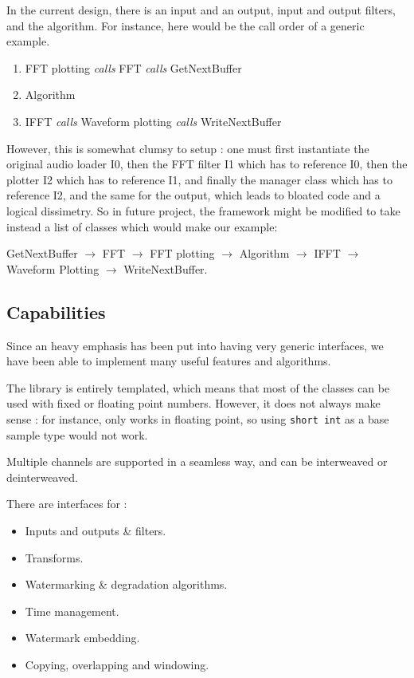 In the current design, there is an input and an output, input and output filters, and the algorithm. For instance, here would be the call order of a generic example.

\begin{enumerate}
\item FFT plotting \textit{calls} FFT \textit{calls} GetNextBuffer
\item Algorithm
\item IFFT \textit{calls} Waveform plotting \textit{calls} WriteNextBuffer
\end{enumerate}

However, this is somewhat clumsy to setup : one must first instantiate the original audio loader I0, then the FFT filter I1 which has to reference I0, then the plotter I2 which has to reference I1, and finally the manager class which has to reference I2, and the same for the output, which leads to bloated code and a logical dissimetry.
So in future project, the framework might be modified to take instead a list of classes which would make our example:

GetNextBuffer $\rightarrow$ FFT $\rightarrow$ FFT plotting $\rightarrow$ Algorithm $\rightarrow$ IFFT $\rightarrow$ Waveform Plotting $\rightarrow$ WriteNextBuffer.

\newpage

\subsection{Capabilities}
Since an heavy emphasis has been put into having very generic interfaces, we have been able to implement many useful features and algorithms.

The library is entirely templated, which means that most of the classes can be used with fixed or floating point numbers. However, it does not always make sense : for instance,  only works in floating point, so using \texttt{short int} as a base sample type would not work.

Multiple channels are supported in a seamless way, and can be interweaved or deinterweaved.

There are interfaces for : 
\begin{itemize}
\item Inputs and outputs \& filters.
\item Transforms.
\item Watermarking \& degradation algorithms.
\item Time management.
\item Watermark embedding.
\item Copying, overlapping and windowing.
\end{itemize}

